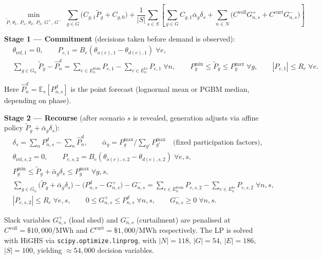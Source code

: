 \documentclass[11pt]{article}
\begin{document}
\begin{equation*}
\min_{\tilde{P},\,\theta_1,\,P_1,\,\theta_2,\,P_2,\,G^+,\,G^-}
\;\sum_{g\in G}\!\bigl(C_{g,1}\tilde{P}_g + C_{g,0}\bigr)
+ \frac{1}{|S|}\sum_{s\in S}\!\left[
  \sum_{g\in G} C_{g,1}\bar{\alpha}_g\delta_s
  + \sum_{n\in N}\!\bigl(C^{\text{voll}}G^+_{n,s} + C^{\text{curt}}G^-_{n,s}\bigr)
\right]
\end{equation*}

\textbf{Stage 1 — Commitment} (decisions taken before demand is observed):
\begin{align*}
&\theta_{\text{ref},1} = 0, \qquad
 P_{e,1} = B_e\!\left(\theta_{o(e),1} - \theta_{d(e),1}\right)\;\forall e,\\
&\sum_{g\in G_n}\!\tilde{P}_g - \hat{P}^d_n
 = \!\!\sum_{e\in E^{\text{from}}_n}\!\!P_{e,1} - \!\!\sum_{e\in E^{\text{to}}_n}\!\!P_{e,1}\;\forall n,\qquad
 P^{\min}_g \le \tilde{P}_g \le P^{\max}_g\;\forall g,\qquad
 |P_{e,1}| \le R_e\;\forall e.
\end{align*}

Here $\hat{P}^d_n = \mathbb{E}_s[P^d_{n,s}]$ is the point forecast (lognormal mean or PGBM median, depending on phase).

\textbf{Stage 2 — Recourse} (after scenario $s$ is revealed, generation adjusts via affine policy $\tilde{P}_g + \bar{\alpha}_g\delta_s$):
\begin{align*}
&\delta_s = \textstyle\sum_n P^d_{n,s} - \sum_n \hat{P}^d_n,\qquad
 \bar{\alpha}_g = P^{\max}_g \big/ \textstyle\sum_{g'}P^{\max}_{g'}\quad\text{(fixed participation factors)},\\
&\theta_{\text{ref},s,2} = 0,\qquad
 P_{e,s,2} = B_e\!\left(\theta_{o(e),s,2} - \theta_{d(e),s,2}\right)\;\forall e,s,\\
&P^{\min}_g \le \tilde{P}_g + \bar{\alpha}_g\delta_s \le P^{\max}_g\;\forall g,s,\\
&\sum_{g\in G_n}\!\!\bigl(\tilde{P}_g+\bar{\alpha}_g\delta_s\bigr) - \bigl(P^d_{n,s} - G^+_{n,s}\bigr) - G^-_{n,s}
 = \!\!\sum_{e\in E^{\text{from}}_n}\!\!P_{e,s,2} - \!\!\sum_{e\in E^{\text{to}}_n}\!\!P_{e,s,2}\;\forall n,s,\\
&|P_{e,s,2}| \le R_e\;\forall e,s,\qquad
 0 \le G^+_{n,s} \le P^d_{n,s}\;\forall n,s,\qquad
 G^-_{n,s}\ge 0\;\forall n,s.
\end{align*}

Slack variables $G^+_{n,s}$ (load shed) and $G^-_{n,s}$ (curtailment) are penalised at $C^{\text{voll}}=\$10{,}000$/MWh and $C^{\text{curt}}=\$1{,}000$/MWh respectively. The LP is solved with HiGHS via \texttt{scipy.optimize.linprog}, with $|N|=118$, $|G|=54$, $|E|=186$, $|S|=100$, yielding ${\approx}54{,}000$ decision variables.
\end{document}
